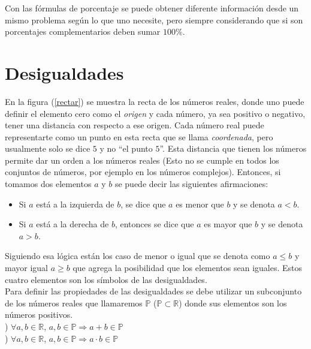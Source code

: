 Con las fórmulas de porcentaje se puede obtener diferente información desde un mismo problema según lo que uno necesite, pero siempre considerando que si son porcentajes complementarios deben sumar $100\%$.\\
 
\section{Desigualdades}

En la figura (\ref{rectar}) se muestra la recta de los números reales, donde uno puede definir el elemento cero como el \textit{origen} y cada número, ya sea positivo o negativo, tener una distancia con respecto a ese origen. Cada número real puede representarte como un punto en esta recta que se llama \textit{coordenada}, pero usualmente solo se dice $5$ y no ``el punto $5$''. Esta distancia que tienen los números permite dar un orden a los números reales (Esto no se cumple en todos los conjuntos de números, por ejemplo en los números complejos). Entonces, si tomamos dos elementos $a$ y $b$ se puede decir las siguientes afirmaciones:
\begin{itemize}
\item  Si $a$ está a la izquierda de $b$, se dice que $a$ es menor que $b$ y se denota $a<b$.
\item  Si $a$ está a la derecha de $b$, entonces se dice que $a$ es mayor que $b$ y se denota $a>b$.
\end{itemize}
 Siguiendo esa lógica están los caso de menor o igual que se denota como $a\leq b$ y mayor igual $a\geq b$ que agrega la posibilidad que los elementos sean iguales. Estos cuatro elementos son los símbolos de las desigualdades.\\

Para definir las propiedades de las desigualdades se debe utilizar un subconjunto de los números reales que llamaremos $\mathbb{P}$ ($\mathbb{P}\subset\mathbb{R}$) donde sus elementos son los números positivos.\\

) $\forall a,b\in\mathbb{R}$, $a,b\in\mathbb{P}\Rightarrow a+b\in\mathbb{P}$ \\

) $\forall a,b\in\mathbb{R}$, $a,b\in\mathbb{P}\Rightarrow a\cdot b\in\mathbb{P}$ \\

